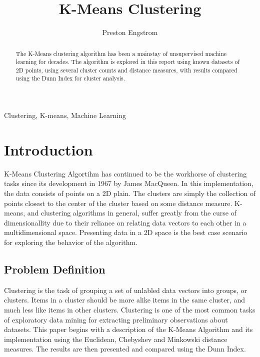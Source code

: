 \documentclass[journal]{IEEEtran}
\begin{document}
\title{K-Means Clustering}

\author{Preston Engstrom}

\maketitle
\lstset{language=Python}

\begin{abstract}
The K-Means clustering algorithm has been a mainstay of unsupervised machine learning for decades. The algorithm is explored in this report using known datasets of 2D points, using several cluster counts and distance measures, with results compared using the Dunn Index for cluster analysis.
\end{abstract}


\begin{IEEEkeywords}
Clustering, K-means, Machine Learning
\end{IEEEkeywords}

\IEEEpeerreviewmaketitle


\section{Introduction}
 K-Means Clustering Algortihm has continued to be the workhorse of clustering tasks since its development in 1967 by James MacQueen.
In this implementation, the data consists of points on a 2D plain. The clusters are simply the collection of points closest to the center of the cluster based on some distance measure. K-means, and clustering algorithms in general, suffer greatly from the curse of dimensionallity due to their reliance on relating data vectors to each other in a multidimensional space. Presenting data in a 2D space is the best case scenario for exploring the behavior of the algorithm. 

\subsection{Problem Definition}
 Clustering is the task of grouping a set of unlabled data vectors into groups, or clusters. Items in a cluster should be more alike items in the same cluster, and much less like items in other clusters. Clustering is one of the most common tasks of exploratory data mining for extracting preliminary observations about datasets. This paper begins with a description of the K-Means Algorithm and its implementation using the Euclidean, Chebyshev and Minkowski distance measures. The results are then presented and compared using the Dunn Index.
\end{document}
